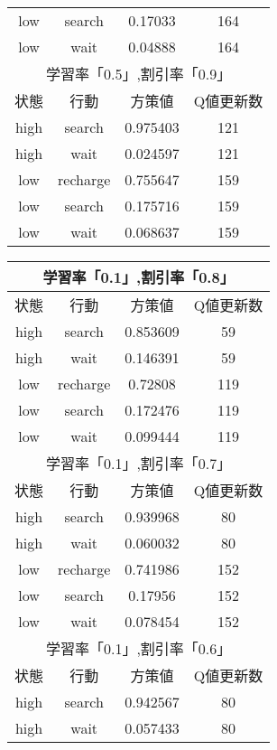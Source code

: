 \begin{table}[b]
\begin{minipage}[!t]{0.45\hsize}
\begin{tabular}{|c|c|c|c|}
      low & search & 0.17033 & 164 \\
      low & wait & 0.04888 & 164 \\
      \hline\hline
      \multicolumn{4}{|c|}{学習率「0.5」,割引率「0.9」} \\
      \hline
      状態 & 行動 & 方策値 & Q値更新数\\
      \hline
      high & search & 0.975403 & 121 \\
      high & wait & 0.024597 & 121 \\\hline
      low & recharge & 0.755647 & 159 \\
      low & search & 0.175716 & 159 \\
      low & wait & 0.068637 & 159 \\
      \hline
    \end{tabular}
  \end{minipage}
  \begin{minipage}[!t]{0.45\hsize}
    \begin{tabular}{|c|c|c|c|}
      \hline
      \multicolumn{4}{|c|}{学習率「0.1」,割引率「0.8」} \\
      \hline
      状態 & 行動 & 方策値 & Q値更新数\\
      \hline
      high & search & 0.853609 & 59 \\
      high & wait & 0.146391 & 59 \\\hline
      low & recharge & 0.72808 & 119 \\
      low & search & 0.172476 & 119 \\
      low & wait & 0.099444 & 119 \\
      \hline\hline
      \multicolumn{4}{|c|}{学習率「0.1」,割引率「0.7」} \\
      \hline
      状態 & 行動 & 方策値 & Q値更新数\\
      \hline
      high & search & 0.939968 & 80 \\
      high & wait & 0.060032 & 80 \\\hline
      low & recharge & 0.741986 & 152 \\
      low & search & 0.17956 & 152 \\
      low & wait & 0.078454 & 152 \\
      \hline\hline
      \multicolumn{4}{|c|}{学習率「0.1」,割引率「0.6」} \\
      \hline
      状態 & 行動 & 方策値 & Q値更新数\\
      \hline
      high & search & 0.942567 & 80 \\
      high & wait & 0.057433 & 80 \\\hline

\end{tabular}
\end{minipage}
\end{table}
